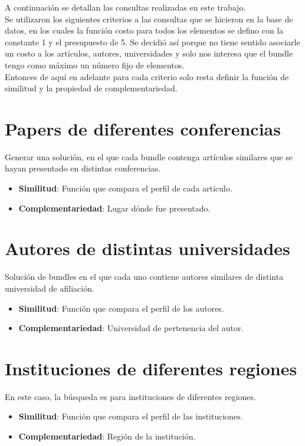 A continuación se detallan las consultas realizadas en este trabajo.\\
Se utilizaron los siguientes criterios a las consultas que se hicieron en la base de datos, en los cuales la función costo para todos los elementos se defino con la constante 1 y el presupuesto de 5. Se decidió así porque no tiene sentido asociarle un costo a los artículos, autores, universidades y solo nos interesa que el bundle tengo como máximo un número fijo de elementos. \\
Entonces de aquí en adelante para cada criterio solo resta definir la función de similitud y la propiedad de complementariedad.

\section{Papers de diferentes conferencias}\label{bus:papSimDisLug}
Generar una solución, en el que cada bundle contenga artículos similares que se hayan presentado en distintas conferencias.\\
\begin{itemize}
  \item \textbf{Similitud}: Función que compara el perfil de cada artículo.
  \item \textbf{Complementariedad}: Lugar dónde fue presentado.
\end{itemize}

\section{Autores de distintas universidades}
Solución de bundles en el que cada uno contiene autores similares de distinta universidad de afiliación.\\
\begin{itemize}
  \item \textbf{Similitud}: Función que compara el perfil de los autores.
  \item \textbf{Complementariedad}: Universidad de pertenencia del autor.
\end{itemize}

\section{Instituciones de diferentes regiones}
En este caso, la búsqueda es para instituciones de diferentes regiones. 
\begin{itemize}
  \item \textbf{Similitud}: Función que compara el perfil de las instituciones.
  \item \textbf{Complementariedad}: Región de la institución.
\end{itemize}

